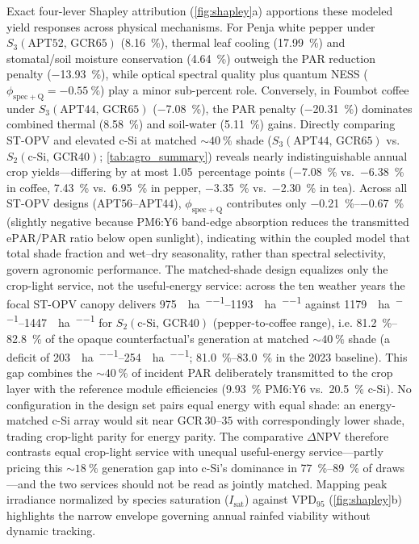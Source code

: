 \documentclass[preprint,12pt,a4paper]{elsarticle}
\begin{document}
Exact four-lever Shapley attribution (\cref{fig:shapley}a) apportions these modeled yield responses across physical mechanisms. For Penja white pepper under $S_3(\mathrm{APT52,\,GCR65})$ (\qty{+8.16}{\percent}), thermal leaf cooling (\qty{+17.99}{\percent}) and stomatal/soil moisture conservation (\qty{+4.64}{\percent}) outweigh the PAR reduction penalty (\qty{-13.93}{\percent}), while optical spectral quality plus quantum NESS ($\phi_{\mathrm{spec+Q}} = \qty{-0.55}{\percent}$) play a minor sub-percent role. Conversely, in Foumbot coffee under $S_3(\mathrm{APT44,\,GCR65})$ (\qty{-7.08}{\percent}), the PAR penalty (\qty{-20.31}{\percent}) dominates combined thermal (\qty{+8.58}{\percent}) and soil-water (\qty{+5.11}{\percent}) gains. Directly comparing ST-OPV and elevated c-Si at matched $\sim\qty{40}{\percent}$ shade ($S_3(\mathrm{APT44,\,GCR65})$ vs.\ $S_2(\mathrm{c\text{-}Si,\,GCR40})$; \cref{tab:agro_summary}) reveals nearly indistinguishable annual crop yields---differing by at most \num{1.05}~percentage points (\qty{-7.08}{\percent} vs.\ \qty{-6.38}{\percent} in coffee, \qty{+7.43}{\percent} vs.\ \qty{+6.95}{\percent} in pepper, \qty{-3.35}{\percent} vs.\ \qty{-2.30}{\percent} in tea). Across all ST-OPV designs ($\mathrm{APT56}$--$\mathrm{APT44}$), $\phi_{\mathrm{spec+Q}}$ contributes only \qtyrange{-0.21}{-0.67}{\percent} (slightly negative because PM6:Y6 band-edge absorption reduces the transmitted $\mathrm{ePAR}/\mathrm{PAR}$ ratio below open sunlight), indicating within the coupled model that total shade fraction and wet--dry seasonality, rather than spectral selectivity, govern agronomic performance. The matched-shade design equalizes only the crop-light service, not the useful-energy service: across the ten weather years the focal ST-OPV canopy delivers \qtyrange{975}{1193}{\MWh\per\hectare\per\yr} against \qtyrange{1179}{1447}{\MWh\per\hectare\per\yr} for $S_2(\mathrm{c\text{-}Si,\,GCR40})$ (pepper-to-coffee range), i.e. \qtyrange{81.2}{82.8}{\percent} of the opaque counterfactual's generation at matched $\sim\qty{40}{\percent}$ shade (a deficit of \qtyrange{203}{254}{\MWh\per\hectare\per\yr}; \qtyrange{81.0}{83.0}{\percent} in the 2023 baseline). This gap combines the $\sim\qty{40}{\percent}$ of incident PAR deliberately transmitted to the crop layer with the reference module efficiencies (\qty{9.93}{\percent} PM6:Y6 vs.\ \qty{20.5}{\percent} c-Si). No configuration in the design set pairs equal energy with equal shade: an energy-matched c-Si array would sit near $\mathrm{GCR}\,30$--$35$ with correspondingly lower shade, trading crop-light parity for energy parity. The comparative $\Delta\mathrm{NPV}$ therefore contrasts equal crop-light service with unequal useful-energy service---partly pricing this $\sim\qty{18}{\percent}$ generation gap into c-Si's dominance in \qtyrange{77}{89}{\percent} of draws---and the two services should not be read as jointly matched. Mapping peak irradiance normalized by species saturation ($I_{\mathrm{sat}}$) against $\mathrm{VPD}_{95}$ (\cref{fig:shapley}b) highlights the narrow envelope governing annual rainfed viability without dynamic tracking.
\end{document}
